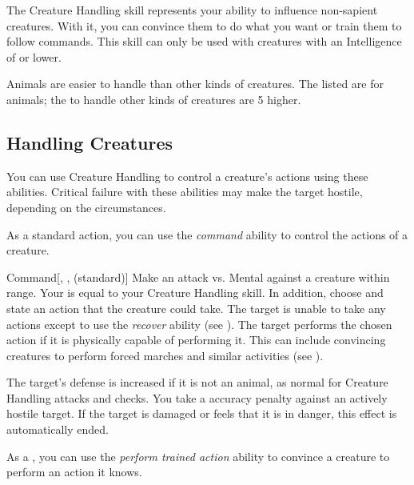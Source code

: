 \newpage
{}
    The Creature Handling skill represents your ability to influence non-sapient creatures.
    With it, you can convince them to do what you want or train them to follow commands. This skill can only be used with creatures with an Intelligence of  or lower.

        Animals are easier to handle than other kinds of creatures.
        The  listed are for animals; the  to handle other kinds of creatures are 5 higher.

    \subsection{Handling Creatures}
        You can use Creature Handling to control a creature's actions using these abilities.
        Critical failure with these abilities may make the target hostile, depending on the circumstances.

        As a standard action, you can use the \textit{command} ability to control the actions of a creature.

        \begin{freeability}{Command}[, ,  (standard)]
            \label{Command}
            Make an attack vs. Mental against a creature within \rngmed range.
            Your  is equal to your Creature Handling skill.
            In addition, choose and state an action that the creature could take.
            \hit The target is unable to take any actions except to use the \textit{recover} ability (see ).
            \crit The target performs the chosen action if it is physically capable of performing it.
            This can include convincing creatures to perform forced marches and similar activities (see ).
            
            The target's defense is increased if it is not an animal, as normal for Creature Handling attacks and checks.
            You take a  accuracy penalty against an actively hostile target.
            If the target is damaged or feels that it is in danger, this effect is automatically ended.
        \end{freeability}

        As a , you can use the \textit{perform trained action} ability to convince a creature to perform an action it knows.

